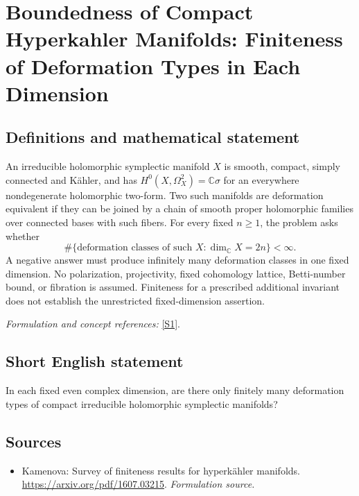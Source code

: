 \documentclass[11pt]{article}
\begin{document}
\section*{\texorpdfstring{Boundedness of Compact Hyperkahler Manifolds: Finiteness of Deformation Types in Each Dimension}{Boundedness of Compact Hyperkahler Manifolds: Finiteness of Deformation Types in Each Dimension}}\label{30006921}
\subsection{Definitions and mathematical statement}
An irreducible holomorphic symplectic manifold $X$ is smooth, compact, simply connected and K\"ahler, and has $H^0(X,\Omega_X^2)={\mathbb{C}}\sigma$ for an everywhere nondegenerate holomorphic two-form. Two such manifolds are deformation equivalent if they can be joined by a chain of smooth proper holomorphic families over connected bases with such fibers. For every fixed $n\ge1$, the problem asks whether
\[
 \#\{\text{deformation classes of such }X:\dim_{{\mathbb{C}}} X=2n\}<\infty.
\]
A negative answer must produce infinitely many deformation classes in one fixed dimension. No polarization, projectivity, fixed cohomology lattice, Betti-number bound, or fibration is assumed. Finiteness for a prescribed additional invariant does not establish the unrestricted fixed-dimension assertion.
\par\smallskip\textit{Formulation and concept references:} \href{https://arxiv.org/pdf/1607.03215}{[S1]}.

\subsection{Short English statement}
In each fixed even complex dimension, are there only finitely many deformation types of compact irreducible holomorphic symplectic manifolds?
\subsection{Sources}
\begin{itemize}
\item[S1]Kamenova: Survey of finiteness results for hyperkähler manifolds.
\url{https://arxiv.org/pdf/1607.03215}.
\textit{Formulation source.}
\end{itemize}
\end{document}
